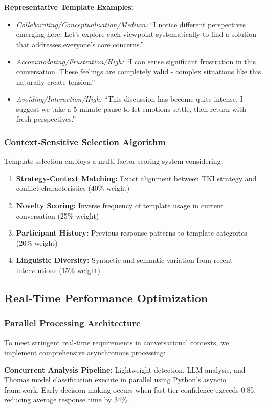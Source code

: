 \documentclass[12pt,a4paper]{article}
\begin{document}
\textbf{Representative Template Examples:}
\begin{itemize}
\item \textit{Collaborating/Conceptualization/Medium:} ``I notice different perspectives emerging here. Let's explore each viewpoint systematically to find a solution that addresses everyone's core concerns.''
\item \textit{Accommodating/Frustration/High:} ``I can sense significant frustration in this conversation. These feelings are completely valid - complex situations like this naturally create tension.''
\item \textit{Avoiding/Interaction/High:} ``This discussion has become quite intense. I suggest we take a 5-minute pause to let emotions settle, then return with fresh perspectives.''
\end{itemize}

\subsubsection{Context-Sensitive Selection Algorithm}
Template selection employs a multi-factor scoring system considering:
\begin{enumerate}
\item \textbf{Strategy-Context Matching:} Exact alignment between TKI strategy and conflict characteristics (40\% weight)
\item \textbf{Novelty Scoring:} Inverse frequency of template usage in current conversation (25\% weight)
\item \textbf{Participant History:} Previous response patterns to template categories (20\% weight)
\item \textbf{Linguistic Diversity:} Syntactic and semantic variation from recent interventions (15\% weight)
\end{enumerate}

\subsection{Real-Time Performance Optimization}

\subsubsection{Parallel Processing Architecture}
To meet stringent real-time requirements in conversational contexts, we implement comprehensive asynchronous processing:

\textbf{Concurrent Analysis Pipeline:} Lightweight detection, LLM analysis, and Thomas model classification execute in parallel using Python's asyncio framework. Early decision-making occurs when fast-tier confidence exceeds 0.85, reducing average response time by 34\%.
\end{document}
